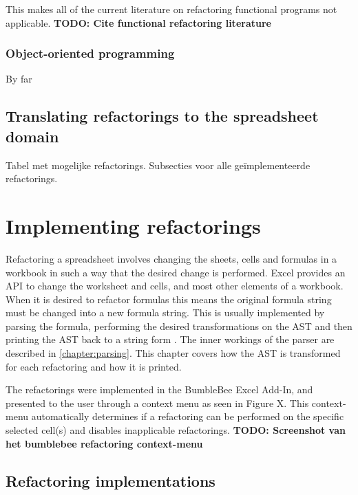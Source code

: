 \documentclass[12pt,a4paper,onecolumn,oneside,parskip]{memoir}
\newcommand{\todo}[1]{\textbf{TODO: #1}}
\begin{document}
This makes all of the current literature on refactoring functional programs not applicable.
\todo{Cite functional refactoring literature}

\subsection{Object-oriented programming}

By far 



\section{Translating refactorings to the spreadsheet domain}

Tabel met mogelijke refactorings.
Subsecties voor alle geïmplementeerde refactorings.



\chapter{Implementing refactorings}
\label{chapter:implementingrefactorings}

Refactoring a spreadsheet involves changing the sheets, cells and formulas in a workbook in such a way that the desired change is performed.
Excel provides an API to change the worksheet and cells, and most other elements of a workbook.
When it is desired to refactor formulas this means the original formula string must be changed into a new formula string.
This is usually implemented by parsing the formula, performing the desired transformations on the AST and then printing the AST back to a string form \cite{fowler1999refactoring}.
The inner workings of the parser are described in \ref{chapter:parsing}.
This chapter covers how the AST is transformed for each refactoring and how it is printed.

The refactorings were implemented in the BumbleBee Excel Add-In, and presented to the user through a context menu as seen in Figure X.
This context-menu automatically determines if a refactoring can be performed on the specific selected cell(s) and disables inapplicable refactorings.
\todo{Screenshot van het bumblebee refactoring context-menu}

\section{Refactoring implementations}
\label{sec:implementingrefactorings}
\end{document}

